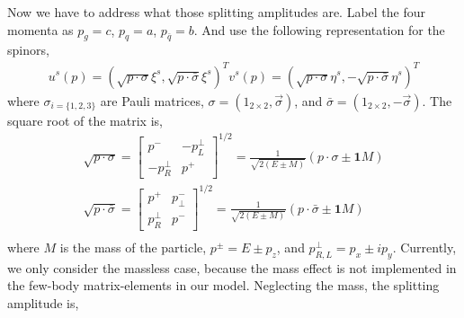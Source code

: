 Now we have to address what those splitting amplitudes are.
Label the four momenta as $p_g = c$, $p_q = a$, $p_{\bar{q}} = b$.
And use the following representation for the spinors,
\begin{eqnarray}
u^s(p) = (\sqrt{p\cdot \sigma} \xi^s, \sqrt{p\cdot \bar{\sigma}} \xi^s)^T
v^s(p) = (\sqrt{p\cdot \sigma} \eta^s, -\sqrt{p\cdot \bar{\sigma}} \eta^s)^T
\end{eqnarray}
where $\sigma_{i=\{1,2,3\}}$ are Pauli matrices, $\sigma = (1_{2\times 2}, \vec{\sigma})$, and $\bar{\sigma} = (1_{2\times 2}, -\vec{\sigma})$.
The square root of the matrix is,
\begin{eqnarray}
\sqrt{p\cdot \sigma} =
\left.
\begin{bmatrix}
p^- & -p_L^\perp \\
-p_R^\perp & p^+
\end{bmatrix}\right.^{1/2} 
= \frac{1}{\sqrt{2(E\pm M)}}(p\cdot\sigma \pm \mathbf{1}M)\\
\sqrt{p\cdot \bar{\sigma}} =
\left.
\begin{bmatrix}
p^+ & p_\perp^- \\
p_R^\perp & p^-
\end{bmatrix}\right.^{1/2} 
= \frac{1}{\sqrt{2(E\pm M)}}(p\cdot\bar{\sigma} \pm \mathbf{1}M)\\
\end{eqnarray}
where $M$ is the mass of the particle, $p^\pm = E\pm p_z$, and $p_{R,L}^\perp = p_x \pm  i p_y$.
Currently, we only consider the massless case, because the mass effect is not implemented in the few-body matrix-elements in our model.
Neglecting the mass, the splitting amplitude is,
